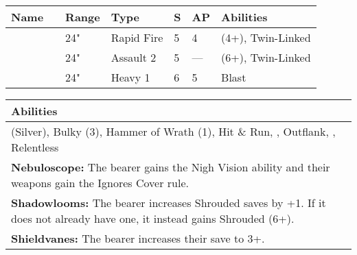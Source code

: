 \noindent
\begin{tabular}{||m{110pt} m{30pt} m{31pt} m{55pt} m{12pt} m{12pt} m{210pt}||}
	\hline
	Name & & Range & Type & S & AP & Abilities \\
	\hline
	\quickref{Gauss Blaster} & & 24" & Rapid Fire & 5 & 4 & \quickref{Gauss} (4+), Twin-Linked \\
	\quickref{Tesla Carbine} & & 24" & Assault 2 & 5 & — & \quickref{Tesla} (6+), Twin-Linked \\
	\quickref{Particle Beamer} & & 24" & Heavy 1 & 6 & 5 & Blast \\
	\hline
\end{tabular}

\noindent
\begin{tabular}{||m{532pt}||}
	\hline
	Abilities \\
	\hline
	\quickref{Awakening Protocols} (Silver), Bulky (3), Hammer of Wrath (1), Hit \& Run, \quickref{Living Metal}, Outflank, \quickref{Reanimation Protocols}, Relentless\\
	\textbf{Nebuloscope:} The bearer gains the Nigh Vision ability and their weapons gain the Ignores Cover rule.\\
	\textbf{Shadowlooms:} The bearer increases Shrouded saves by +1. If it does not already have one, it instead gains Shrouded (6+). \\
	\textbf{Shieldvanes:} The bearer increases their save to 3+.\\
	\hline
\end{tabular}